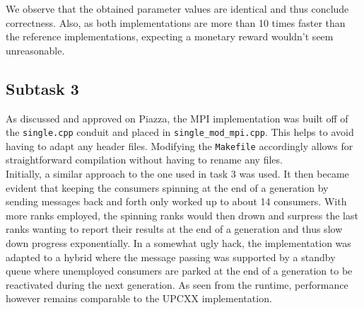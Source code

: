 \documentclass[11pt,a4paper]{article}
\begin{document}
We observe that the obtained parameter values are identical and thus conclude correctness. Also,
as both implementations are more than 10 times faster than the reference implementations, expecting a
monetary reward wouldn't seem unreasonable.

\subsection{Subtask 3}
As discussed and approved on Piazza, the MPI implementation was built off of the \texttt{single.cpp} conduit
and placed in \texttt{single\_mod\_mpi.cpp}. This helps to avoid having to adapt any header files. Modifying the \texttt{Makefile} accordingly allows for straightforward
compilation without having to rename any files.\\
Initially, a similar approach to the one used in task 3 was used. It then became evident that keeping the 
consumers spinning at the end of a generation by sending messages back and forth only worked up to about 14 consumers.
With more ranks employed, the spinning ranks would then drown and surpress the last ranks wanting to report their results at the end of a generation
and thus slow down progress exponentially. In a somewhat ugly hack, the implementation was adapted to a hybrid
where the message passing was supported by a standby queue where unemployed consumers are parked at the end
of a generation to be reactivated during the next generation. As seen from the runtime, performance however remains
comparable to the UPCXX implementation.
\end{document}
